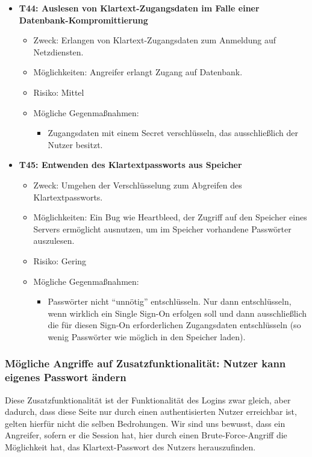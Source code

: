 \documentclass[12pt,DIV14,BCOR10mm,a4paper,parskip=half-,headsepline,headinclude,english,ngerman,bibliography=totocnumbered]{scrreprt}
\begin{document}
\begin{itemize}
  \hypertarget{threat44}{}
  \item \textbf{T44: Auslesen von Klartext-Zugangsdaten im Falle einer Datenbank-Kompromittierung}
  \begin{itemize}
    \item Zweck: Erlangen von Klartext-Zugangsdaten zum Anmeldung auf Netzdiensten.
    \item Möglichkeiten: Angreifer erlangt Zugang auf Datenbank.
    \item Risiko: Mittel
    \item Mögliche Gegenmaßnahmen:
      \begin{itemize}
      	\item Zugangsdaten mit einem Secret verschlüsseln, das ausschließlich der Nutzer besitzt.
      \end{itemize}
  \end{itemize}

  \hypertarget{threat45}{}
  \item \textbf{T45: Entwenden des Klartextpassworts aus Speicher}
  \begin{itemize}
    \item Zweck: Umgehen der Verschlüsselung zum Abgreifen des Klartextpassworts.
    \item Möglichkeiten: Ein Bug wie Heartbleed, der Zugriff auf den Speicher eines Servers ermöglicht ausnutzen, um im Speicher vorhandene Passwörter auszulesen.
    \item Risiko: Gering
    \item Mögliche Gegenmaßnahmen:
      \begin{itemize}
      \item Passwörter nicht \enquote{unnötig} entschlüsseln. Nur dann entschlüsseln, wenn wirklich ein Single Sign-On erfolgen soll und dann ausschließlich die für diesen Sign-On erforderlichen Zugangsdaten entschlüsseln (so wenig Passwörter wie möglich in den Speicher laden).
      \end{itemize}
  \end{itemize}

\end{itemize}



\subsubsection{Mögliche Angriffe auf Zusatzfunktionalität: Nutzer kann eigenes Passwort ändern}

Diese Zusatzfunktionalität ist der Funktionalität des Logins zwar gleich, aber dadurch, dass diese Seite nur durch einen authentisierten Nutzer erreichbar ist, gelten hierfür nicht die selben Bedrohungen.
Wir sind uns bewusst, dass ein Angreifer, sofern er die Session hat, hier durch einen Brute-Force-Angriff die Möglichkeit hat, das Klartext-Passwort des Nutzers herauszufinden.
\end{document}
